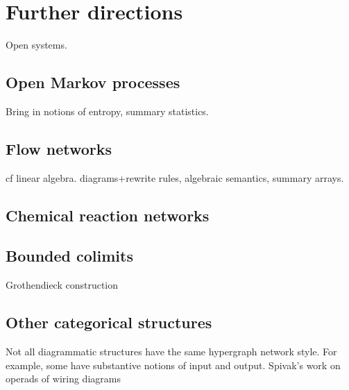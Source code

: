 \chapter{Further directions}

Open systems. 

\section{Open Markov processes}
Bring in notions of entropy, summary statistics. 
\section{Flow networks}
cf linear algebra. diagrams+rewrite rules, algebraic semantics, summary arrays.



\section{Chemical reaction networks}

\section{Bounded colimits}


Grothendieck construction
\section{Other categorical structures}
Not all diagrammatic structures have the same hypergraph network style. For
example, some have substantive notions of input and output. Spivak's work on
operads of wiring diagrams 

